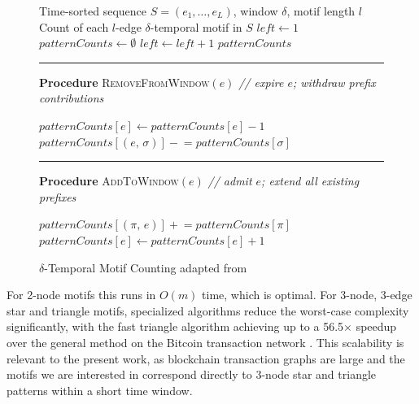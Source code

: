 \documentclass{thesisclass}
\begin{document}
\begin{figure}[t]
\begin{minipage}{\linewidth}

\begin{algorithm}[H]
\caption{$\delta$-Temporal Motif Counting adapted from \citet{paranjape2017motifs}}
\label{alg:paranjape}
\begin{algorithmic}[1]
\Require Time-sorted sequence $S = (e_1, \ldots, e_L)$,
         window $\delta$, motif length $l$
\Ensure Count of each $l$-edge $\delta$-temporal motif in $S$
\State $\textit{left} \gets 1$
\State $\textit{patternCounts} \gets \emptyset$
        \State {}
        \State $\textit{left} \gets \textit{left} + 1$
    \EndWhile
    \State {}
\EndFor
\State \Return $\textit{patternCounts}$
\end{algorithmic}

\noindent\rule{\linewidth}{0.4pt}
\noindent\textbf{Procedure} \textsc{RemoveFromWindow}$(e)$
\hfill\textit{// expire $e$; withdraw prefix contributions}
\begin{algorithmic}[1]
\State $\textit{patternCounts}[e] \gets \textit{patternCounts}[e] - 1$
    \State $\textit{patternCounts}[(e,\,\sigma)]
           \mathrel{-}= \textit{patternCounts}[\sigma]$
\EndFor
\end{algorithmic}

\noindent\rule{\linewidth}{0.4pt}
\noindent\textbf{Procedure} \textsc{AddToWindow}$(e)$
\hfill\textit{// admit $e$; extend all existing prefixes}
\begin{algorithmic}[1]
    \State $\textit{patternCounts}[(\pi,\,e)]
           \mathrel{+}= \textit{patternCounts}[\pi]$
\EndFor
\State $\textit{patternCounts}[e] \gets \textit{patternCounts}[e] + 1$
\end{algorithmic}

\end{algorithm}
\end{minipage}
\end{figure}
 
For 2-node motifs this runs in 
$O(m)$ time, which is optimal. For 3-node, 3-edge star and triangle motifs, specialized algorithms reduce the worst-case complexity significantly, with the fast triangle algorithm achieving up to a 56.5$\times$ speedup over the general method on the Bitcoin transaction network \cite{paranjape2017motifs}. This scalability is relevant to the present work, as blockchain transaction graphs are large and the motifs we are interested in correspond directly to 3-node star and triangle patterns within a short time window.
\end{document}
